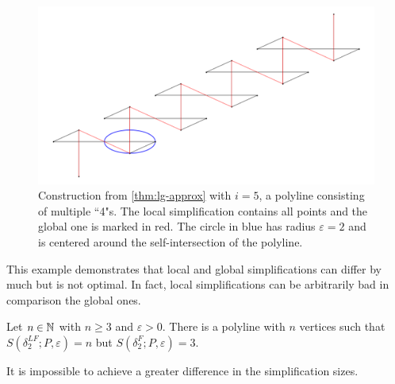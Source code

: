 \begin{figure}[h!tbp]
  \centering
	\includegraphics[scale=0.3]{./figures/local-global-bigdiff.png}
	\caption{Construction from \cref{thm:lg-approx} with \(i = 5\), a polyline consisting of multiple ``4"s. The local simplification contains all points and the global one is marked in red. The circle in blue has radius \(\varepsilon = 2\) and is centered around the self-intersection of the polyline.}
  \label{fig:local-global-bigdiff}
\end{figure}

This example demonstrates that local and global simplifications can differ by much but is not optimal. In fact, local simplifications can be arbitrarily bad in comparison the global ones.
\begin{theorem}
	Let \(n \in \mathbb{N}\) with \(n \geq 3\) and \(\varepsilon > 0\). There is a polyline with \(n\) vertices such that \(S(\delta^{LF}_2; P, \varepsilon) = n\) but \(S(\delta^F_2; P, \varepsilon) = 3\).

	It is impossible to achieve a greater difference in the simplification sizes.
\end{theorem}

